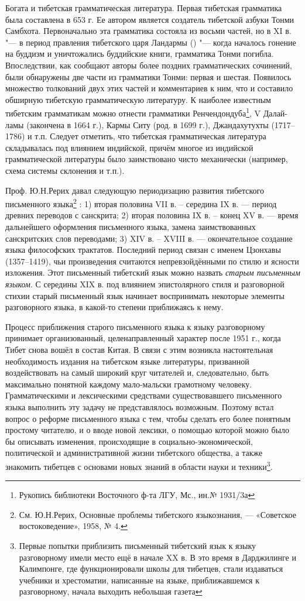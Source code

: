 Богата и тибетская грамматическая литература. Первая тибетская грамматика была составлена в 653 г. Ее автором является создатель тибетской азбуки Тонми Самбхота. Первоначально эта грамматика состояла из восьми частей, но в XI в. "--- в период правления тибетского царя Ландармы () "--- когда началось гонение на буддизм и уничтожались буддийские книги, грамматика Тонми погибла. Впоследствии, как сообщают авторы более поздних грамматических сочинений, были обнаружены две части из грамматики Тонми: первая и шестая. Появилось множество толкований двух этих частей и комментариев к ним, что и составило обширную тибетскую грамматическую литературу. К наиболее известным тибетским грамматикам можно отнести грамматики Ренчендондуба\footnote[3]{Рукопись библиотеки Восточного ф-та ЛГУ, Мс., ин.№ 1931/3а}, V Далай-ламы (закончена в 1664 г.), Кармы Ситу (род. в 1699 г.), Джандахутухты (1717--1786) и т.п. Следует отметить, что тибетская грамматическая литература складывалась под влиянием индийской, причём многое из индийской грамматической литературы было заимствовано чисто механически (например, схема системы склонения и т.п.).

Проф. Ю.Н.Рерих давал следующую периодизацию развития тибетского письменного языка\footnote[4]{См. Ю.Н.Рерих, Основные проблемы тибетского языкознания, --- «Советское востоковедение», 1958, № 4.} : 1) вторая половина VII в. -- середина IX в. --- период древних переводов с санскрита; 2) вторая половина IX в. -- конец XV в. --- время дальнейшего оформления письменного языка, замена заимствованных санскритских слов переводами; 3) XIV в. -- XVIII в. --- окончательное создание языка философских трактатов. Последний период связан с именем Цзонхавы (1357--1419), чьи произведения считаются непревзойдёнными по стилю и ясности изложения. Этот письменный тибетский язык можно назвать \emph{старым письменным языком}. С середины XIX в. под влиянием эпистолярного стиля и разговорной стихии старый письменный язык начинает воспринимать некоторые элементы разговорного языка, в какой-то степени приближаясь к нему.

Процесс приближения старого письменного языка к языку разговорному принимает организованный, целенаправленный характер после 1951 г., когда Тибет снова вошёл в состав Китая. В связи с этим возникла настоятельная необходимость издания на тибетском языке литературы, призванной воздействовать на самый широкий круг читателей и, следовательно, быть максимально понятной каждому мало-мальски грамотному человеку. Грамматическими и лексическими средствами существовавшего письменного языка выполнить эту задачу не представлялось возможным. Поэтому встал вопрос о реформе письменного языка с тем, чтобы сделать его более понятным простому читателю, и о вводе новой лексики, о помощью которой можно было бы описывать изменения, происходящие в социально-экономической, политической и административной жизни тибетского общества, а также знакомить тибетцев с основами новых знаний в области науки и техники\footnote[5]{Первые попытки приблизить письменный тибетский язык к языку разговорному имели место ещё в начале XX в. В это время в Дарджилинге и Калимпонге, где функционировали школы для тибетцев, стали издаваться учебники и хрестоматии, написанные на языке, приближавшемся к разговорному, начала выходить небольшая газета}.

